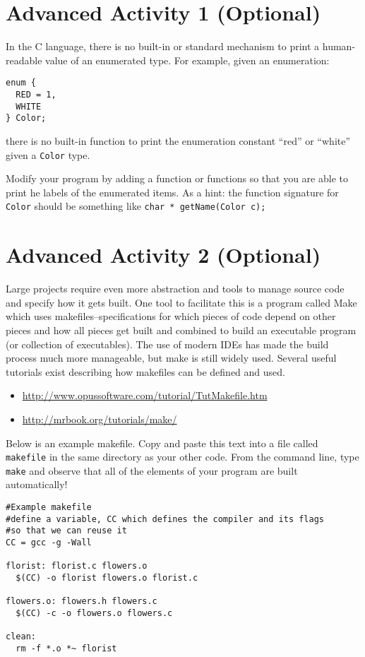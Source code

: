 \documentclass[12pt]{scrartcl}
\begin{document}
\section{Advanced Activity 1 (Optional)}

In the C language, there is no built-in or standard mechanism to print 
a human-readable value of an enumerated type.  For example, given 
an enumeration:

\begin{verbatim}
enum { 
  RED = 1, 
  WHITE 
} Color;
\end{verbatim} 

there is no built-in function to print the enumeration constant ``red'' 
or ``white'' given a \texttt{Color} type.

Modify your program by adding a function or functions so that you 
are able to print he labels of the enumerated items.  As a hint: the 
function signature for \texttt{Color} should be something like
\texttt{char * getName(Color c);}

\section{Advanced Activity 2 (Optional)}

Large projects require even more abstraction and tools to manage 
source code and specify how it gets built.  One tool to facilitate this 
is a program called Make which uses makefiles--specifications for 
which pieces of code depend on other pieces and how all pieces 
get built and combined to build an executable program (or collection 
of executables).  The use of modern IDEs has made the build process 
much more manageable, but make is still widely used.  Several 
useful tutorials exist describing how makefiles can be defined and 
used.
\begin{itemize}
  \item \url{http://www.opussoftware.com/tutorial/TutMakefile.htm}
  \item \url{http://mrbook.org/tutorials/make/}
\end{itemize}
Below is an example makefile.  Copy and paste this text into a file 
called \texttt{makefile} in the same directory as your other 
code.  From the command line, type \texttt{make} and 
observe that all of the elements of your program are built automatically!

\begin{verbatim}
#Example makefile
#define a variable, CC which defines the compiler and its flags
#so that we can reuse it
CC = gcc -g -Wall

florist: florist.c flowers.o
  $(CC) -o florist flowers.o florist.c

flowers.o: flowers.h flowers.c
  $(CC) -c -o flowers.o flowers.c

clean:
  rm -f *.o *~ florist
\end{verbatim}
\end{document}
